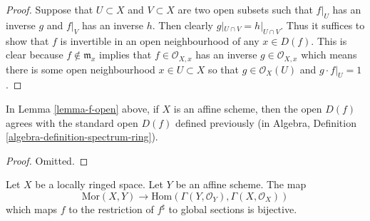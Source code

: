 \begin{proof}
Suppose that $U \subset X$ and $V \subset X$ are
two open subsets such that $f|_U$ has an inverse
$g$ and $f|_V$ has an inverse $h$. Then clearly
$g|_{U\cap V} = h|_{U\cap V}$. Thus it suffices
to show that $f$ is invertible in an open neighbourhood
of any $x \in D(f)$. This is clear because
$f \not \in \mathfrak m_x$ implies that $f \in \mathcal{O}_{X,x}$
has an inverse $g \in \mathcal{O}_{X,x}$ which means there
is some open neighbourhood $x \in U \subset X$ so
that $g \in \mathcal{O}_X(U)$ and $g\cdot f|_U = 1$.
\end{proof}

\begin{lemma}
\label{lemma-f-open-affine}
In Lemma \ref{lemma-f-open} above, if $X$ is an affine scheme,
then the open $D(f)$ agrees with the standard open $D(f)$
defined previously (in
Algebra, Definition \ref{algebra-definition-spectrum-ring}).
\end{lemma}

\begin{proof}
Omitted.
\end{proof}

\begin{lemma}
\label{lemma-morphism-into-affine}
Let $X$ be a locally ringed space.
Let $Y$ be an affine scheme.
The map
$$
\text{Mor}(X, Y)
\longrightarrow
\text{Hom}(\Gamma(Y, \mathcal{O}_Y), \Gamma(X, \mathcal{O}_X))
$$
which maps $f$ to the restriction of $f^\sharp$ to global
sections is bijective.
\end{lemma}

